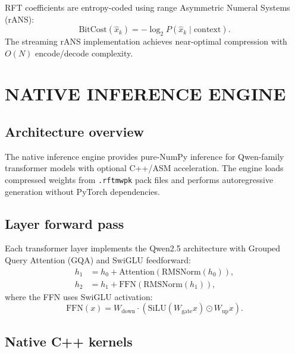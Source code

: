 \documentclass[aip,twocolumn,letterpaper]{revtex4}
\begin{document}
RFT coefficients are entropy-coded using range Asymmetric Numeral Systems (rANS):
\begin{equation}
\mathrm{BitCost}(\hat{x}_k) = -\log_2 P(\hat{x}_k \mid \mathrm{context}).
\label{eq:bitcost}
\end{equation}
The streaming rANS implementation achieves near-optimal compression with \(O(N)\) encode/decode complexity.

\section{NATIVE INFERENCE ENGINE}

\subsection{Architecture overview}

The native inference engine provides pure-NumPy inference for Qwen-family transformer models with optional C++/ASM acceleration. The engine loads compressed weights from \texttt{.rftmwpk} pack files and performs autoregressive generation without PyTorch dependencies.

\subsection{Layer forward pass}

Each transformer layer implements the Qwen2.5 architecture with Grouped Query Attention (GQA) and SwiGLU feedforward:
\begin{align}
h_1 &= h_0 + \mathrm{Attention}(\mathrm{RMSNorm}(h_0)), \label{eq:attn} \\
h_2 &= h_1 + \mathrm{FFN}(\mathrm{RMSNorm}(h_1)), \label{eq:ffn}
\end{align}
where the FFN uses SwiGLU activation:
\begin{equation}
\mathrm{FFN}(x) = W_\mathrm{down} \cdot (\mathrm{SiLU}(W_\mathrm{gate} x) \odot W_\mathrm{up} x).
\label{eq:swiglu}
\end{equation}

\subsection{Native C++ kernels}
\end{document}
